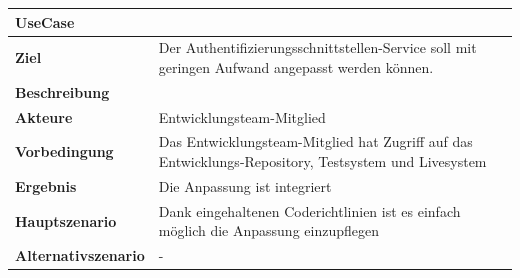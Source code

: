 \begin{longtable}[c]{@{}ll@{}}
\toprule
\begin{minipage}[b]{0.34\columnwidth}\raggedright\strut
\textbf{UseCase}
\strut\end{minipage} &
\begin{minipage}[b]{0.60\columnwidth}\raggedright\strut
\strut\end{minipage}\tabularnewline
\midrule
\endhead
\begin{minipage}[t]{0.34\columnwidth}\raggedright\strut
\textbf{Ziel}
\strut\end{minipage} &
\begin{minipage}[t]{0.60\columnwidth}\raggedright\strut
Der Authentifizierungsschnittstellen-Service soll mit geringen Aufwand
angepasst werden können.
\strut\end{minipage}\tabularnewline
\begin{minipage}[t]{0.34\columnwidth}\raggedright\strut
\textbf{Beschreibung}
\strut\end{minipage} &
\begin{minipage}[t]{0.60\columnwidth}\raggedright\strut
\strut\end{minipage}\tabularnewline
\begin{minipage}[t]{0.34\columnwidth}\raggedright\strut
\textbf{Akteure}
\strut\end{minipage} &
\begin{minipage}[t]{0.60\columnwidth}\raggedright\strut
Entwicklungsteam-Mitglied
\strut\end{minipage}\tabularnewline
\begin{minipage}[t]{0.34\columnwidth}\raggedright\strut
\textbf{Vorbedingung}
\strut\end{minipage} &
\begin{minipage}[t]{0.60\columnwidth}\raggedright\strut
Das Entwicklungsteam-Mitglied hat Zugriff auf das
Entwicklungs-Repository, Testsystem und Livesystem
\strut\end{minipage}\tabularnewline
\begin{minipage}[t]{0.34\columnwidth}\raggedright\strut
\textbf{Ergebnis}
\strut\end{minipage} &
\begin{minipage}[t]{0.60\columnwidth}\raggedright\strut
Die Anpassung ist integriert
\strut\end{minipage}\tabularnewline
\begin{minipage}[t]{0.34\columnwidth}\raggedright\strut
\textbf{Hauptszenario}
\strut\end{minipage} &
\begin{minipage}[t]{0.60\columnwidth}\raggedright\strut
Dank eingehaltenen Coderichtlinien ist es einfach möglich die Anpassung
einzupflegen
\strut\end{minipage}\tabularnewline
\begin{minipage}[t]{0.34\columnwidth}\raggedright\strut
\textbf{Alternativszenario}
\strut\end{minipage} &
\begin{minipage}[t]{0.60\columnwidth}\raggedright\strut
-
\strut\end{minipage}\tabularnewline
\bottomrule
\end{longtable}

